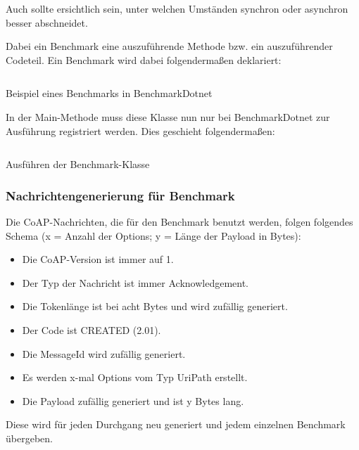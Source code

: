 Auch sollte ersichtlich sein, unter welchen Umständen synchron oder asynchron besser abschneidet.

Dabei ein Benchmark eine auszuführende Methode bzw. ein auszuführender Codeteil. Ein Benchmark wird dabei folgendermaßen deklariert:

\begin{listing}[H]
    \inputminted[framesep=2mm, baselinestretch=1.2, fontsize=\normalsize, linenos]{csharp}{codes/benchmark_example.cs}
    \caption{Beispiel eines Benchmarks in BenchmarkDotnet}
    \label{listing:beispiel-eines-benchmarks-in-benchmarkdotnet}
\end{listing}

In der Main-Methode muss diese Klasse nun nur bei BenchmarkDotnet zur Ausführung registriert werden. Dies geschieht folgendermaßen:

\begin{listing}[H]
    \inputminted[framesep=2mm, baselinestretch=1.2, fontsize=\normalsize, linenos]{csharp}{codes/execution_of_benchmark.cs}
    \caption{Ausführen der Benchmark-Klasse}
    \label{listing:ausfuehren-der-benchmark-klasse}
\end{listing}

\subsubsection{Nachrichtengenerierung für Benchmark}
\label{subsubsec:nachrichtengenerierung-fuer-benchmark}

Die CoAP-Nachrichten, die für den Benchmark benutzt werden, folgen folgendes Schema (x = Anzahl der Options; y = Länge der Payload in Bytes):
\begin{itemize}
    \item Die CoAP-Version ist immer auf 1.
    \item Der Typ der Nachricht ist immer Acknowledgement.
    \item Die Tokenlänge ist bei acht Bytes und wird zufällig generiert.
    \item Der Code ist CREATED (2.01).
    \item Die MessageId wird zufällig generiert.
    \item Es werden x-mal Options vom Typ UriPath erstellt.
    \item Die Payload zufällig generiert und ist y Bytes lang.
\end{itemize}

Diese wird für jeden Durchgang neu generiert und jedem einzelnen Benchmark übergeben.

